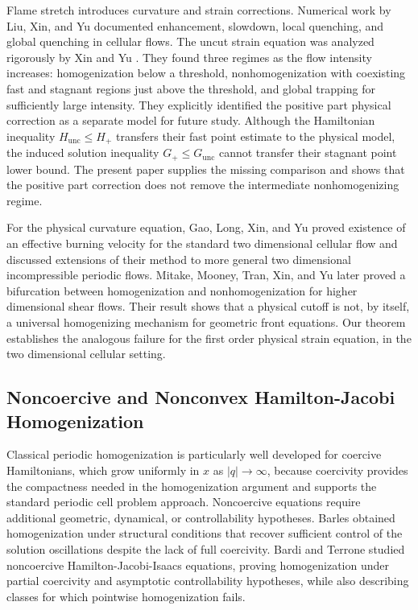 \documentclass[11pt,reqno,noamsfonts]{amsart}
\theoremstyle{definition}
\theoremstyle{remark}
\newcommand{\Hunc}{H_{\mathrm{unc}}}
\newcommand{\Hcut}{H_{+}}
\newcommand{\Gunc}{G_{\mathrm{unc}}}
\newcommand{\Gcut}{G_{+}}
\begin{document}
Flame stretch introduces curvature and strain corrections.  Numerical work by Liu, Xin, and Yu \cite{LiuXinYu2013} documented enhancement, slowdown, local quenching, and global quenching in cellular flows.  The uncut strain equation was analyzed rigorously by Xin and Yu \cite{XinYu2014}.  They found three regimes as the flow intensity increases: homogenization below a threshold, nonhomogenization with coexisting fast and stagnant regions just above the threshold, and global trapping for sufficiently large intensity.  They explicitly identified the positive part physical correction as a
separate model for future study.  Although the Hamiltonian inequality
$\Hunc\leq\Hcut$ transfers their fast point estimate to the physical
model, the induced solution inequality $\Gcut\leq\Gunc$ cannot transfer
their stagnant point lower bound.  The present paper supplies the
missing comparison and shows that the positive part correction does not
remove the intermediate nonhomogenizing regime.

For the physical curvature equation, Gao, Long, Xin, and Yu
\cite{GaoLongXinYu2024} proved existence of an effective burning
velocity for the standard two dimensional cellular flow and discussed
extensions of their method to more general two dimensional
incompressible periodic flows.  Mitake, Mooney, Tran, Xin, and Yu \cite{MitakeMooneyTranXinYu2025} later proved a bifurcation between homogenization and nonhomogenization for higher dimensional shear flows.  Their result shows that a physical cutoff is not, by itself, a universal homogenizing mechanism for geometric front equations.  Our theorem establishes the analogous failure for the first order physical strain equation, in the two dimensional cellular setting.

\subsection{Noncoercive and Nonconvex Hamilton-Jacobi Homogenization}\label{H-J-sec}
Classical periodic homogenization is particularly well developed for
coercive Hamiltonians, which grow uniformly in $x$ as $|q|\to\infty$,
because coercivity provides the compactness needed in the homogenization
argument and supports the standard periodic cell problem approach.
Noncoercive equations require additional geometric, dynamical, or
controllability hypotheses. Barles \cite{Barles2007} obtained homogenization under structural
conditions that recover sufficient control of the solution oscillations
despite the lack of full coercivity. Bardi and Terrone \cite{BardiTerrone2013} studied noncoercive
Hamilton-Jacobi-Isaacs equations, proving homogenization under
partial coercivity and asymptotic controllability hypotheses, while also
describing classes for which pointwise homogenization fails.
\end{document}
